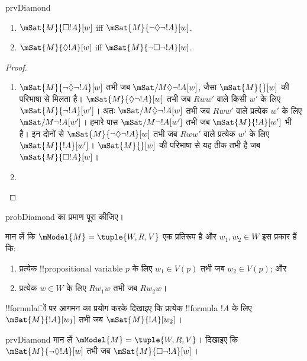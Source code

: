 \documentclass[../../../include/open-logic-section]{subfiles}
\begin{document}
\begin{tagblock}{prvDiamond}
\begin{prop}
  \begin{enumerate}
  \item $\mSat{M}{\Box !A}[w]$ iff $\mSat{M}{\lnot\Diamond\lnot !A}[w]$.
  \item $\mSat{M}{\Diamond !A}[w]$ iff $\mSat{M}{\lnot\Box\lnot !A}[w]$.
  \end{enumerate}
\end{prop}

\begin{proof}
  \begin{enumerate}
    \item $\mSat{M}{\lnot\Diamond\lnot !A}[w]$ तभी जब
      $\mSat/{M}{\Diamond\lnot !A}[w]$, जैसा $\mSat{M}{}[w]$ की परिभाषा से
      मिलता है। $\mSat{M}{\Diamond\lnot !A}[w]$ तभी जब $Rww'$ वाले किसी
      $w'$ के लिए $\mSat{M}{\lnot !A}[w']$। अतः
      $\mSat/{M}{\Diamond\lnot !A}[w]$ तभी जब $Rww'$ वाले प्रत्येक $w'$ के
      लिए $\mSat/{M}{\lnot !A}[w']$। हमारे पास
      $\mSat/{M}{\lnot !A}[w']$ तभी जब $\mSat{M}{!A}[w']$ भी है। इन दोनों
      से $\mSat{M}{\lnot\Diamond\lnot !A}[w]$ तभी जब $Rww'$ वाले प्रत्येक
      $w'$ के लिए $\mSat{M}{!A}[w']$। $\mSat{M}{}[w]$ की परिभाषा से यह ठीक
      तभी है जब $\mSat{M}{\Box !A}[w]$।
    \item {}
  \end{enumerate}
\end{proof}

\begin{probtag}{probDiamond}
   का प्रमाण पूरा कीजिए।
\end{probtag}
\end{tagblock}

\begin{prob}
  मान लें कि $\mModel{M} = \tuple{W, R, V}$ एक प्रतिरूप है और
  $w_1, w_2 \in W$ इस प्रकार हैं कि:
  \begin{enumerate}
  \item प्रत्येक !!{propositional variable} $p$ के लिए $w_1 \in V(p)$ तभी जब
    $w_2 \in V(p)$; और
  \item प्रत्येक $w \in W$ के लिए $Rw_1w$ तभी जब $Rw_2w$।
  \end{enumerate}
  !!{formula}ों पर आगमन का प्रयोग करके दिखाइए कि प्रत्येक !!{formula} $!A$ के
  लिए $\mSat{M}{!A}[w_1]$ तभी जब $\mSat{M}{!A}[w_2]$।
\end{prob}

\begin{probtag}{prvDiamond}
  मान लें $\mModel{M} = \tuple{W, R, V}$। दिखाइए कि
  $\mSat{M}{\lnot\Diamond !A}[w]$ तभी जब
  $\mSat{M}{\Box\lnot!A}[w]$।
\end{probtag}
\end{document}

